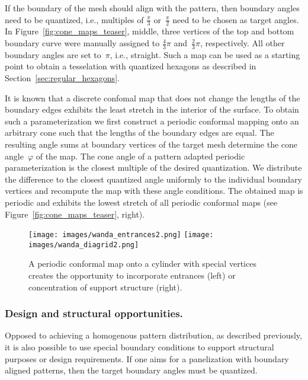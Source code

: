 \documentclass[Thesis.tex]{subfiles}
\begin{document}
If the boundary of the mesh should align with the pattern,
then boundary angles need to be quantized, i.e., multiples of
$\tfrac{\pi}{3}$ or~$\tfrac{\pi}{2}$ need to be chosen as target
angles. In Figure~\ref{fig:cone_maps_teaser}, middle, three vertices
of the top and bottom boundary curve were manually assigned to
$\tfrac{4}{3}\pi$ and~$\tfrac{2}{3}\pi$, respectively. All other
boundary angles are set to~$\pi$, i.e., straight.  Such a map can
be used as a starting point to obtain a tesselation with quantized
hexagons as described in Section~\ref{sec:regular_hexagons}.

It is known that a discrete confomal map that does not change the lengths of the 
boundary edges exhibits the least stretch in the interior of the surface.
To obtain such a parameterization we first construct a periodic conformal 
mapping onto an
arbitrary cone such that the lengths of the boundary edges are equal. The resulting angle sums at boundary vertices of the
target mesh determine the cone angle~$\varphi$ of the map. The cone angle of
a pattern adapted periodic parameterization is the closest multiple of the 
desired quantization. We distribute the difference to the closest
quantized angle uniformly to the individual boundary vertices and
recompute the map with these angle conditions. The obtained map is 
periodic and exhibits the lowest stretch of all periodic conformal maps (see
Figure~\ref{fig:cone_maps_teaser}, right).  

\begin{figure}[bt]
  \centering
  \texttt{[image: images/wanda\_entrances2.png]}
  \hspace{.5cm}
  \texttt{[image: images/wanda\_diagrid2.png]}
  \caption{A periodic conformal map onto a cylinder with special
    vertices creates the opportunity to incorporate entrances (left)
    or concentration of support structure (right).}
  \label{fig:entrance}
\end{figure}

\subsubsection{Design and structural opportunities.}
Opposed to achieving a homogenous pattern distribution, as described
previously, it is also possible to use special boundary conditions to
support structural purposes or design requirements. If one aims for a
panelization with boundary aligned patterns, then the target boundary
angles must be quantized.
\end{document}
